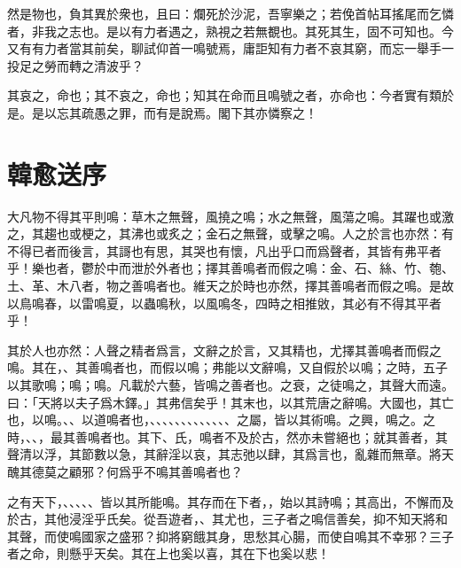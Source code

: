 然是物也，負其異於衆也，且曰：爛死於沙泥，吾寧樂之；若俛首帖耳搖尾而乞憐者，非我之志也。是以有力者遇之，熟視之若無覩也。其死其生，固不可知也。今又有有力者當其前矣，聊試仰首一鳴號焉，庸詎知有力者不哀其窮，而忘一舉手一投足之勞而轉之清波乎？

其哀之，命也；其不哀之，命也；知其在命而且鳴號之者，亦命也：今者實有類於是。是以忘其疏愚之罪，而有是說焉。閣下其亦憐察之！

\section[送孟東野序\quad{\small 韓愈}]{{\normalsize 韓愈}\quad 送序}
大凡物不得其平則鳴：草木之無聲，風撓之鳴；水之無聲，風蕩之鳴。其躍也或激之，其趨也或梗之，其沸也或炙之；金石之無聲，或擊之鳴。人之於言也亦然：有不得已者而後言，其謌也有思，其哭也有懷，凡出乎口而爲聲者，其皆有弗平者乎！樂也者，鬱於中而泄於外者也；擇其善鳴者而假之鳴：金、石、絲、竹、匏、土、革、木八者，物之善鳴者也。維天之於時也亦然，擇其善鳴者而假之鳴。是故以鳥鳴春，以雷鳴夏，以蟲鳴秋，以風鳴冬，四時之相推敓，其必有不得其平者乎！

其於人也亦然：人聲之精者爲言，文辭之於言，又其精也，尤擇其善鳴者而假之鳴。其在，、其善鳴者也，而假以鳴；弗能以文辭鳴，又自假於以鳴；之時，五子以其歌鳴；鳴；鳴。凡載於六藝，皆鳴之善者也。之衰，之徒鳴之，其聲大而遠。曰：「天將以夫子爲木鐸。」其弗信矣乎！其末也，以其荒唐之辭鳴。大國也，其亡也，以鳴。、、以道鳴者也，、、、、、、、、、、、、、之屬，皆以其術鳴。之興，鳴之。之時，、、，最其善鳴者也。其下、氏，鳴者不及於古，然亦未嘗絕也；就其善者，其聲清以浮，其節數以急，其辭淫以哀，其志弛以肆，其爲言也，亂雜而無章。將天醜其德莫之顧邪？何爲乎不鳴其善鳴者也？

之有天下，、、、、、皆以其所能鳴。其存而在下者，，始以其詩鳴；其高出，不懈而及於古，其他浸淫乎氏矣。從吾遊者，、其尤也，三子者之鳴信善矣，抑不知天將和其聲，而使鳴國家之盛邪？抑將窮餓其身，思愁其心腸，而使自鳴其不幸邪？三子者之命，則懸乎天矣。其在上也奚以喜，其在下也奚以悲！

